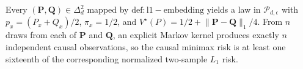 Every \((\mathbf P,\mathbf Q)\in\Delta_d^2\) mapped by \(\mathrm{def:l1-embedding}\) yields a law in \(\mathcal P_{d,\epsilon}\) with \(p_x=(P_x+Q_x)/2\), \(\pi_x=1/2\), and \(V^\star(P)=1/2+\lVert\mathbf P-\mathbf Q\rVert_1/4\). From \(n\) draws from each of \(\mathbf P\) and \(\mathbf Q\), an explicit Markov kernel produces exactly \(n\) independent causal observations, so the causal minimax risk is at least one sixteenth of the corresponding normalized two-sample \(L_1\) risk.